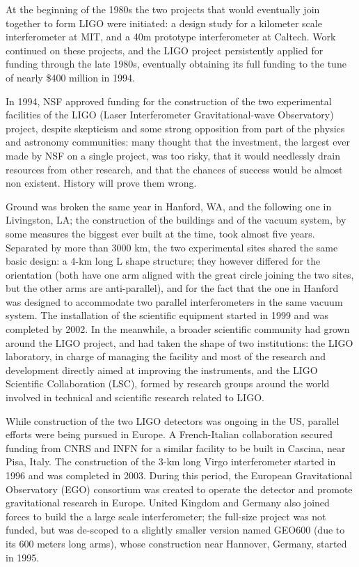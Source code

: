 At the beginning of the 1980s the two projects that would eventually join together to form LIGO were initiated: 
a design study for a kilometer scale interferometer at MIT, and a 40m 
prototype interferometer at Caltech. Work continued on these projects, and the LIGO project persistently applied 
for funding through the late 1980s, eventually obtaining its full funding to the tune of nearly \$400 million in 1994. 



In 1994, NSF approved funding for the construction of the two experimental facilities 
of the LIGO (Laser Interferometer Gravitational-wave Observatory) project, despite 
skepticism and some strong opposition from part of the physics and astronomy 
communities: many thought that the investment, the largest ever made by NSF on a 
single project, was too risky, that it would needlessly drain resources from other 
research, and that the chances of success would be almost non existent. History will prove them wrong.

Ground was broken the same year in Hanford, WA, and the following one in Livingston, LA; 
the construction of the buildings and of the vacuum system, by some measures the biggest 
ever built at the time, took almost five years. Separated by more than 3000 km, the two 
experimental sites shared the same basic design: a 4-km long L shape structure; they 
however differed for the orientation (both have one arm aligned with the great circle joining the two sites, but the other arms are anti-parallel), and for the fact that the one in Hanford was 
designed to accommodate two parallel interferometers in the same vacuum system. 
The installation of the scientific equipment started in 1999 and was completed by 2002. 
In the meanwhile, a broader scientific community had grown around the LIGO project, 
and had taken the shape of two institutions: the LIGO laboratory, in charge of managing 
the facility and most of the research and development directly aimed at improving the 
instruments, and the LIGO Scientific Collaboration (LSC), formed by research groups 
around the world involved in technical and scientific research related to LIGO.

While construction of the two LIGO detectors was ongoing in the US, parallel efforts 
were being pursued in Europe. A French-Italian collaboration secured funding from CNRS and INFN for a 
similar facility to be built in Cascina, near Pisa, Italy. The construction of the 3-km 
long Virgo interferometer started in 1996 and was completed in 2003. During this period, 
the European Gravitational Observatory (EGO) consortium was created to operate the detector 
and promote gravitational research in Europe. United Kingdom and Germany also joined 
forces to build the a large scale interferometer; the full-size project was not funded, but 
was de-scoped to a slightly smaller version named GEO600 (due to its 600 meters long arms), 
whose construction near Hannover, Germany, started in 1995.

